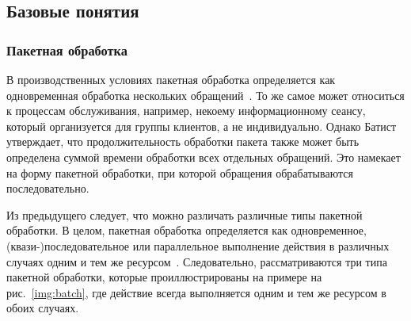 %

\subsection{Базовые понятия}

\subsubsection{Пакетная обработка}

В производственных условиях пакетная обработка определяется как одновременная обработка нескольких обращений~\cite{pinedo2012scheduling}. 
То же самое может относиться к процессам обслуживания, например, некоему информационному сеансу, который организуется для группы клиентов, а не индивидуально. 
Однако Батист~\cite{Baptiste2000} утверждает, что продолжительность обработки пакета также может быть определена суммой времени обработки всех отдельных обращений. 
Это намекает на форму пакетной обработки, при которой обращения обрабатываются последовательно. 

Из предыдущего следует, что можно различать различные типы пакетной обработки. 
В целом, пакетная обработка определяется как одновременное, (квази-)последовательное или параллельное выполнение действия в различных случаях одним и тем же ресурсом~\cite{Martin2015BatchPD}. 
Следовательно, рассматриваются три типа пакетной обработки, которые проиллюстрированы на примере на рис.~\ref{img:batch}, где действие всегда выполняется одним и тем же ресурсом в обоих случаях.

